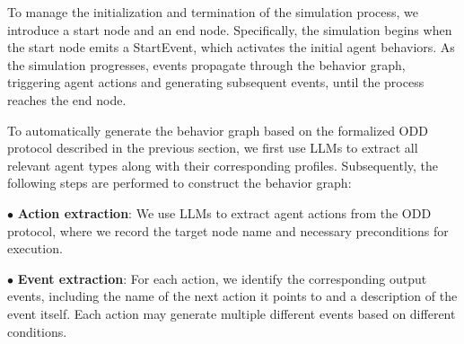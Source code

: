 \documentclass{article}
\theoremstyle{definition}
\theoremstyle{theorem}
\theoremstyle{proof}
\theoremstyle{remark}
\begin{document}


    To manage the initialization and termination of the simulation process, we introduce a start node and an end node. Specifically, the simulation begins when the start node emits a StartEvent, which activates the initial agent behaviors. As the simulation progresses, events propagate through the behavior graph, triggering agent actions and generating subsequent events, until the process reaches the end node.

    To automatically generate the behavior graph based on the formalized ODD protocol described in the previous section, we first use LLMs to extract all relevant agent types along with their corresponding profiles. Subsequently, the following steps are performed to construct the behavior graph:
    
    $\bullet$ \textbf{Action extraction}: We use LLMs to extract agent actions from the ODD protocol, where we record the target node name and necessary preconditions for execution. 
    
    $\bullet$ \textbf{Event extraction}: For each action, we identify the corresponding output events, including the name of the next action it points to and a description of the event itself. Each action may generate multiple different events based on different conditions.
\end{document}

